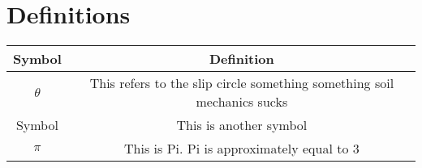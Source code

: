 \section*{Definitions}
\vspace{5mm}
\begin{center}
    
    \begin{tabular}{|c|c|}
    \hline
       \textbf{Symbol}  & \textbf{Definition} \\
       \hline \hline
        $\theta$ & This refers to the slip circle something something soil mechanics sucks\\
        \hline
        Symbol & This is another symbol\\
        \hline
        $\pi$ & This is Pi. Pi is approximately equal to 3\\
        \hline
    \end{tabular}
\end{center}
